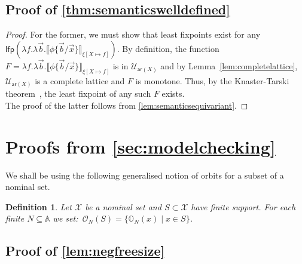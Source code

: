 \documentclass[10pt,a4paper]{article}
\newtheorem{definition}[theorem]{Definition}
\theoremstyle{definition}
\theoremstyle{remark}
\newcommand\sem[2][\xi]{\llbracket#2\rrbracket_{#1}}
\newcommand\Ucal{\mathcal{U}}
\newcommand\Xcal{\mathcal{X}}
\newcommand\Atoms{\mathbb{A}}
\newcommand\orb[1][]{\mathcal{O}_{#1}}
\newcommand\orbs[1][]{\mathbb{O}_{#1}}
\newcommand\ar{\mathsf{ar}}
\newcommand\lfp{\mathsf{lfp}}
\begin{document}
\subsection{Proof of \cref{thm:semanticswelldefined}}
\semanticswelldefined*
\begin{proof}
For the former, we must show that least fixpoints exist for any $\lfp(\lambda f.\lambda \vec b.\sem[{\xi[X \mapsto f]}]{\phi\{\vec b/\vec x\}})$. 
By definition, the function $F = \lambda f.\lambda \vec b.\sem[{\xi[X \mapsto f]}]{\phi\{\vec b/\vec x\}}$ is in $\Ucal_{\ar(X)}$ and by Lemma~\ref{lem:completelattice}, $\Ucal_{\ar(X)}$ is a complete lattice and $F$ is monotone. 
Thus, by the Knaster-Tarski theorem~\cite{Tarski}, the least fixpoint of any such $F$ exists.
\\
The proof of the latter follows from \cref{lem:semanticsequivariant}.
\end{proof}

\section{Proofs from \cref{sec:modelchecking}}
We shall be using the following generalised notion of orbits for a subset of a nominal set.

\begin{definition}
  Let $\Xcal$ be a nominal set and $S\subset\Xcal$ have finite support. For each finite $N\subseteq\Atoms$ we set:\
$
\orb[N](S) = \{ \orbs[N](x)\mid x\in S\} 
$.
\end{definition}

\subsection{Proof of \cref{lem:negfreesize}}
\negfreesize*
\end{document}
